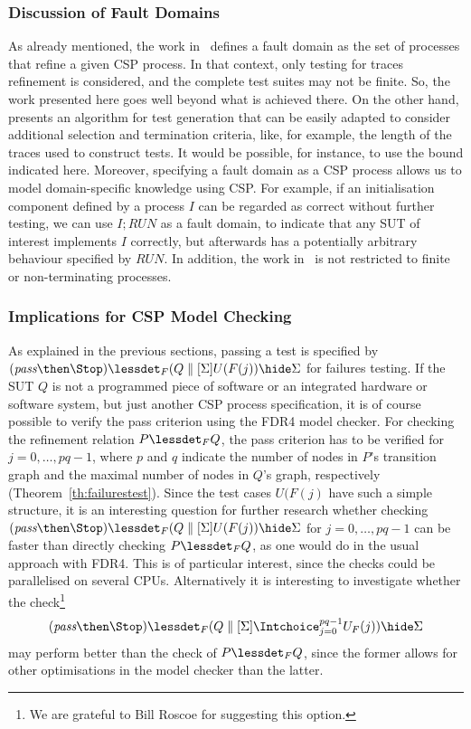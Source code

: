 \subsubsection*{Discussion of Fault Domains}
As already mentioned, the work in~\cite{DBLP:conf/pts/CavalcantiS17} defines
a fault domain as the set of processes that refine a given CSP process.  In
that context, only testing for traces refinement is considered, and the
complete test suites may not be finite. So, the work presented here goes well
beyond what is achieved there. On the other hand,
\cite{DBLP:conf/pts/CavalcantiS17} presents an algorithm for test generation
that can be easily adapted to consider additional selection and termination
criteria, like, for example, the length of the traces used to construct
tests. It would be possible, for instance, to use the bound indicated here.
Moreover, specifying a fault domain as a CSP process allows us to model
domain-specific knowledge using CSP. For example, if an initialisation
component defined by a process $I$ can be regarded as correct without further
testing, we can use $I; RUN$ as a fault domain, to indicate that any SUT of
interest implements $I$ correctly, but afterwards has a potentially arbitrary
behaviour specified by $RUN$. In addition, the work
in~\cite{DBLP:conf/pts/CavalcantiS17} is not restricted to finite or
non-terminating processes.

\subsubsection*{Implications for CSP Model Checking}
As explained in the previous sections, passing a test is specified by
$(\epass\then\Stop) \lessdet_F (Q\parallel[\Sigma] U(F(j)) \hide \Sigma$ for
failures testing. If the SUT $Q$ is not a programmed piece of software or an
integrated hardware or software system, but just another CSP process
specification, it is of course possible to verify the pass criterion using
the FDR4 model checker. For checking the refinement relation $P\lessdet_F Q$,
the pass criterion has to be verified for $j=0,\dots,pq-1$, where $p$ and $q$
indicate the number of nodes in $P$'s transition graph and the maximal number
of nodes in $Q$'s graph, respectively (Theorem~\ref{th:failurestest}). Since
the test cases $U(F(j)$ have such a simple structure, it is an interesting
question for further research whether checking $(\epass\then\Stop) \lessdet_F
(Q\parallel[\Sigma] U(F(j)) \hide \Sigma$ for $j=0,\dots,pq-1$ can be faster
than directly checking $P\lessdet_F Q$, as one would do in the usual approach
with FDR4. This is of particular interest, since the checks could be
parallelised on several CPUs. Alternatively it is interesting to investigate
whether the check\footnote{We are grateful to Bill Roscoe for suggesting this
option.}
\[
(\epass\then\Stop) \lessdet_F (Q\parallel[\Sigma] \Intchoice_{j=0}^{pq-1} U_F(j)) \hide \Sigma
\]
may perform better than the check of $P\lessdet_F Q$, since the former allows for
other optimisations in the model checker than the latter.

